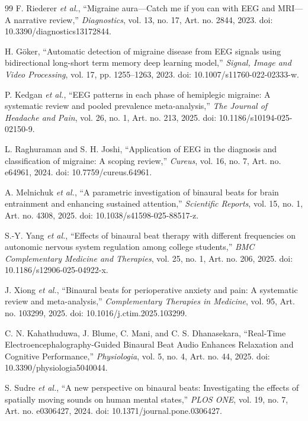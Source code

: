 \documentclass[12pt, a4paper]{report}
\begin{document}
\begin{thebibliography}{99}
F. Riederer \textit{et al.}, ``Migraine aura---Catch me if you can with EEG and MRI---A narrative review,'' \textit{Diagnostics}, vol. 13, no. 17, Art. no. 2844, 2023. doi: 10.3390/diagnostics13172844.

H. G\"oker, ``Automatic detection of migraine disease from EEG signals using bidirectional long-short term memory deep learning model,'' \textit{Signal, Image and Video Processing}, vol. 17, pp. 1255--1263, 2023. doi: 10.1007/s11760-022-02333-w.

P. Kedgan \textit{et al.}, ``EEG patterns in each phase of hemiplegic migraine: A systematic review and pooled prevalence meta-analysis,'' \textit{The Journal of Headache and Pain}, vol. 26, no. 1, Art. no. 213, 2025. doi: 10.1186/s10194-025-02150-9.

L. Raghuraman and S. H. Joshi, ``Application of EEG in the diagnosis and classification of migraine: A scoping review,'' \textit{Cureus}, vol. 16, no. 7, Art. no. e64961, 2024. doi: 10.7759/cureus.64961.

A. Melnichuk \textit{et al.}, ``A parametric investigation of binaural beats for brain entrainment and enhancing sustained attention,'' \textit{Scientific Reports}, vol. 15, no. 1, Art. no. 4308, 2025. doi: 10.1038/s41598-025-88517-z.

S.-Y. Yang \textit{et al.}, ``Effects of binaural beat therapy with different frequencies on autonomic nervous system regulation among college students,'' \textit{BMC Complementary Medicine and Therapies}, vol. 25, no. 1, Art. no. 206, 2025. doi: 10.1186/s12906-025-04922-x.

J. Xiong \textit{et al.}, ``Binaural beats for perioperative anxiety and pain: A systematic review and meta-analysis,'' \textit{Complementary Therapies in Medicine}, vol. 95, Art. no. 103299, 2025. doi: 10.1016/j.ctim.2025.103299.

C. N. Kahathuduwa, J. Blume, C. Mani, and C. S. Dhanasekara, ``Real-Time Electroencephalography-Guided Binaural Beat Audio Enhances Relaxation and Cognitive Performance,'' \textit{Physiologia}, vol. 5, no. 4, Art. no. 44, 2025. doi: 10.3390/physiologia5040044.

S. Sudre \textit{et al.}, ``A new perspective on binaural beats: Investigating the effects of spatially moving sounds on human mental states,'' \textit{PLOS ONE}, vol. 19, no. 7, Art. no. e0306427, 2024. doi: 10.1371/journal.pone.0306427.


\end{thebibliography}
\end{document}
